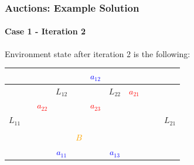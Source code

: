 \begin{frame}
	\frametitle{Auctions: Example Solution}
	\framesubtitle{Case 1 - Iteration 2}
	
	\large
	
	\vspace{0.5cm}
	
	Environment state after iteration 2 is the following:
	
	\begin{table}[!h]
		\centering
		\setlength\tabcolsep{7pt}
		\def\arraystretch{1.3}
		\begin{tabular}{|c|c|c|c|c|c|c|c|c|c|c|}
			\hline
			&  & & & & \textcolor{blue}{$ a_{12} $} & &  &  &  &  \\ \hline
			
			&  & & $ L_{12} $ &  & & $ L_{22} $ & \textcolor{red}{$ a_{21} $} & & & \\ \hline
			
			&  & \textcolor{red}{$ a_{22} $} &  &  & \textcolor{red}{$ a_{23} $} & &  &  &  & \\ \hline
			
			$ L_{11} $ &  &  &  &  &  &  &  &  &  & $ L_{21} $ \\ \hline
			
			&  &  &  &  &  &  &  &  &  & \\ \hline
			
			&  &  &  & \textcolor{orange}{$ B $} &  &  &  &  & &  \\ \hline
			
			& & & \textcolor{blue}{$ a_{11} $} &  &  & \textcolor{blue}{$ a_{13} $} & & &  & \\ \hline
		\end{tabular}
	\end{table}
\end{frame}

